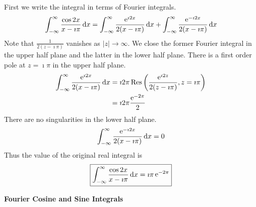 {%
\begin{Solution}
  \label{solution cos(2x)/(x-i pi)}
  First we write the integral in terms of Fourier integrals.
  \[
  \int_{-\infty}^\infty \frac{ \cos 2 x }{ x - \imath \pi } \,\mathrm{d} x
  = \int_{-\infty}^\infty \frac{ \mathop{\mathrm{e}}\nolimits^{\imath 2 x} }{ 2 (x - \imath \pi) } \,\mathrm{d} x
  + \int_{-\infty}^\infty \frac{ \mathop{\mathrm{e}}\nolimits^{-\imath 2 x} }{ 2 (x - \imath \pi) } \,\mathrm{d} x
  \]
  Note that $\frac{1}{2 (z - \imath \pi) }$ vanishes as $|z| \to \infty$.
  We close the former Fourier integral in the upper half plane and the 
  latter in the lower half plane.
  There is a first order pole at $z = \imath \pi$ in the upper half plane.
  \begin{align*}
    \int_{-\infty}^\infty \frac{ \mathop{\mathrm{e}}\nolimits^{\imath 2 x} }{ 2 (x - \imath \pi) } \,\mathrm{d} x
    &= \imath 2 \pi \mathop{\mathrm{Res}}\nolimits \left( \frac{ \mathop{\mathrm{e}}\nolimits^{\imath 2 z} }{ 2 (z - \imath \pi) },
      z = \imath \pi \right) \\
    &= \imath 2 \pi \frac{ \mathop{\mathrm{e}}\nolimits^{-2 \pi} }{ 2 }
  \end{align*}
  There are no singularities in the lower half plane.
  \[
  \int_{-\infty}^\infty \frac{ \mathop{\mathrm{e}}\nolimits^{-\imath 2 x} }{ 2 (x - \imath \pi) } \,\mathrm{d} x = 0
  \]
  Thus the value of the original real integral is
  \[
  \boxed{
    \int_{-\infty}^\infty \frac{ \cos 2 x }{ x - \imath \pi } \,\mathrm{d} x = \imath \pi \mathop{\mathrm{e}}\nolimits^{-2 \pi}
    }
  \]
\end{Solution}









\begin{large}
  \noindent
  \textbf{Fourier Cosine and Sine Integrals}
\end{large}




}
